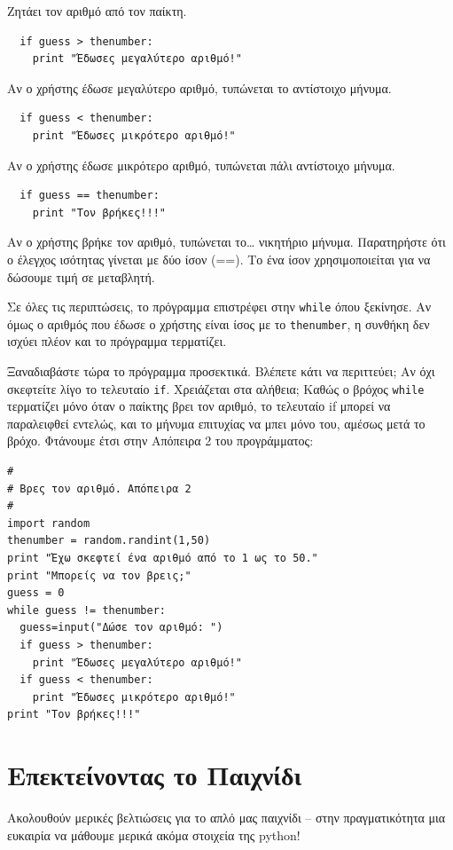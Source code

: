 Ζητάει τον αριθμό από τον παίκτη.

\begin{verbatim}
  if guess > thenumber:
    print "Έδωσες μεγαλύτερο αριθμό!"
\end{verbatim}

Αν ο χρήστης έδωσε μεγαλύτερο αριθμό, τυπώνεται το αντίστοιχο μήνυμα.

\begin{verbatim}
  if guess < thenumber:
    print "Έδωσες μικρότερο αριθμό!"
\end{verbatim}

Αν ο χρήστης έδωσε μικρότερο αριθμό, τυπώνεται πάλι αντίστοιχο μήνυμα.

\begin{verbatim}
  if guess == thenumber:
    print "Τον βρήκες!!!"
\end{verbatim}

Αν ο χρήστης βρήκε τον αριθμό, τυπώνεται το\ldots{} νικητήριο μήνυμα.
Παρατηρήστε ότι ο έλεγχος ισότητας γίνεται με δύο ίσον (==). Το ένα ίσον
χρησιμοποιείται για να δώσουμε τιμή σε μεταβλητή.

Σε όλες τις περιπτώσεις, το πρόγραμμα επιστρέφει στην {\tt while} όπου
ξεκίνησε.  Αν όμως ο αριθμός που έδωσε ο χρήστης είναι ίσος με το
{\tt thenumber}, η συνθήκη δεν ισχύει πλέον και το πρόγραμμα τερματίζει.

Ξαναδιαβάστε τώρα το πρόγραμμα προσεκτικά. Βλέπετε κάτι να περιττεύει;
Αν όχι σκεφτείτε λίγο το τελευταίο {\tt if}. Χρειάζεται στα αλήθεια; Καθώς
ο βρόχος {\tt while} τερματίζει μόνο όταν ο παίκτης βρει τον αριθμό, το
τελευταίο if μπορεί να παραλειφθεί εντελώς, και το μήνυμα επιτυχίας
να μπει μόνο του, αμέσως μετά το βρόχο. Φτάνουμε έτσι στην Απόπειρα 2
του προγράμματος:

\begin{verbatim}
#
# Βρες τον αριθμό. Απόπειρα 2
#
import random
thenumber = random.randint(1,50)
print "Έχω σκεφτεί ένα αριθμό από το 1 ως το 50."
print "Μπορείς να τον βρεις;"
guess = 0
while guess != thenumber:
  guess=input("Δώσε τον αριθμό: ")
  if guess > thenumber:
    print "Έδωσες μεγαλύτερο αριθμό!"
  if guess < thenumber:
    print "Έδωσες μικρότερο αριθμό!"
print "Τον βρήκες!!!"
\end{verbatim}
%
%
\section{Επεκτείνοντας το Παιχνίδι}
%
Ακολουθούν μερικές βελτιώσεις για το απλό μας παιχνίδι -- στην πραγματικότητα μια ευκαιρία να μάθουμε μερικά ακόμα στοιχεία της python!
%
